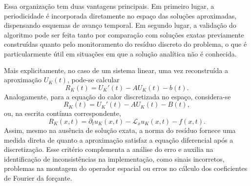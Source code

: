 Essa organização tem duas vantagens principais. Em primeiro lugar, a periodicidade é incorporada diretamente no espaço das soluções aproximadas, dispensando esquemas de avanço temporal. Em segundo lugar, a validação do algoritmo pode ser feita tanto por comparação com soluções exatas previamente construídas quanto pelo monitoramento do resíduo discreto do problema, o que é particularmente útil em situações em que a solução analítica não é conhecida.

Mais explicitamente, no caso de um sistema linear, uma vez reconstruída a aproximação \(U_K(t)\), pode-se calcular
\[
R_K(t)=U_K'(t)-AU_K(t)-b(t).
\]
Analogamente, para a equação do calor discretizada no espaço, considera-se
\[
R_K(t)=U_K'(t)-AU_K(t)-B(t),
\]
ou, na escrita contínua correspondente,
\[
R_K(x,t)=\partial_t u_K(x,t)-\mathcal{L}_x u_K(x,t)-f(x,t).
\]
Assim, mesmo na ausência de solução exata, a norma do resíduo fornece uma medida direta de quanto a aproximação satisfaz a equação diferencial após a discretização. Esse critério complementa a análise do erro e auxilia na identificação de inconsistências na implementação, como sinais incorretos, problemas na montagem do operador espacial ou erros no cálculo dos coeficientes de Fourier da forçante.
